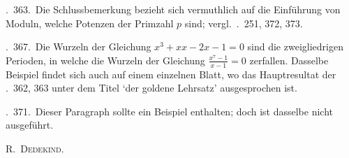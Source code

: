 \textsection.\ 363.\ Die Schlussbemerkung bezieht sich vermuthlich auf die Einführung von Moduln, welche Potenzen der Primzahl $p$ sind; vergl.\ \textsection\textsection.\ 251, 372, 373.

\textsection.\ 367.\ Die Wurzeln der Gleichung $x^3+xx-2x-1=0$ sind die zweigliedrigen Perioden, in welche die Wurzeln der Gleichung $\frac{x^7-1}{x-1}=0$ zerfallen. Dasselbe Beispiel findet sich auch auf einem einzelnen Blatt, wo das Hauptresultat der \textsection\textsection.\ 362, 363 unter dem Titel `der goldene Lehrsatz' ausgesprochen ist.

\textsection.\ 371.\ Dieser Paragraph sollte ein Beispiel enthalten; doch ist dasselbe nicht ausgeführt.
\begin{flushright}R.\ \textsc{Dedekind}.\end{flushright}
